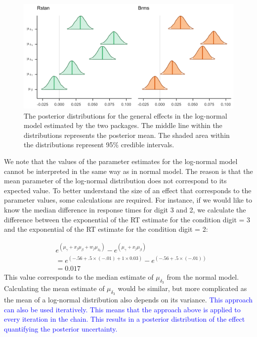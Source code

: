 \documentclass[
  english,
  doc,floatsintext]{apa6}
\begin{document}
\begin{figure}[H]

\includegraphics[width=1\linewidth]{I - Images/Fig13_posteriormulog_v2} \hfill{}

\caption{The posterior distributions for the general effects in the log-normal model estimated by the two packages. The middle line within the distributions represents the posterior mean. The shaded area within the distributions represent 95\% credible intervals.}\label{fig:postplotlog}
\end{figure}

We note that the values of the parameter estimates for the log-normal model cannot be interpreted in the same way as in normal model. The reason is that the mean parameter of the log-normal distribution does not correspond to its expected value. To better understand the size of an effect that corresponds to the parameter values, some calculations are required. For instance, if we would like to know the median difference in response times for digit 3 and 2, we calculate the difference between the exponential of the RT estimate for the condition digit = 3 and the exponential of the RT estimate for the condition digit = 2:

\begin{equation}
\begin{aligned}
&e^{(\mu_{\gamma} + x_j \mu_{\beta} + w_j \mu_{\delta_{3}})} - e^{(\mu_{\gamma} +  x_j \mu_{\beta})} \\
&= e^{(-.56 + .5 \times (-.01) + 1 \times 0.03)} - e^{(-.56 + .5 \times (-.01))} \\ 
&= 0.017 
\end{aligned}
\end{equation}
This value corresponds to the median estimate of \(\mu_{\delta_{3}}\) from the normal model. Calculating the mean estimate of \(\mu_{\delta_{3}}\) would be similar, but more complicated as the mean of a log-normal distribution also depends on its variance. \textcolor{blue}{This approach can also be used iteratively. This means that the approach above is applied to every iteration in the chain. This results in a posterior distribution of the effect quantifying the posterior uncertainty.}
\end{document}
